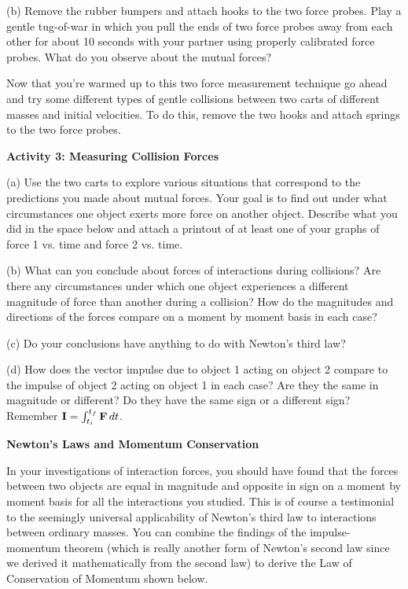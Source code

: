 (b) Remove the rubber bumpers and attach hooks to the two force probes. Play a gentle tug-of-war in which you pull the ends of two force probes
away from each other for about 10 seconds with your partner using properly calibrated force probes. What do you observe about the mutual forces?
\vspace{20mm}

Now that you're warmed up to this two force measurement technique go ahead and
try some different types of gentle collisions between two carts of different
masses and initial velocities. To do this, remove the two hooks and attach springs to the two force probes.

\newpage
\textbf{Activity 3: Measuring Collision Forces }

(a) Use the two carts to explore various situations that correspond to the predictions
you made about mutual forces. Your goal is to find out under what circumstances
one object exerts more force on another object. Describe what you did in the
space below and attach a printout of at least one of your graphs of force 1
vs. time and force 2 vs. time.
\vspace{30mm}

(b) What can you conclude about forces of interactions during collisions? Are there any circumstances under which one object experiences a different magnitude of force
than another during a collision? How do the magnitudes and directions of the
forces compare on a moment by moment basis in each case? 
\vspace{30mm}

(c) Do your conclusions have anything to do with Newton's third law?
\vspace{20mm}

(d) How does the vector impulse due to object 1 acting on object 2 compare to
the impulse of object 2 acting on object 1 in each case? Are they the same in
magnitude or different? Do they have the same sign or a different sign? Remember
\( {\bf I}=\int _{t_{i}}^{t_{f}}{\bf F}\,dt \).
\vspace{20mm}

\textbf{Newton's Laws and Momentum Conservation} 

In your investigations of interaction forces, you should have found that the
forces between two objects are equal in magnitude and opposite in sign on a
moment by moment basis for all the interactions you studied. This is of course
a testimonial to the seemingly universal applicability of Newton's third law
to interactions between ordinary masses. You can combine the findings of the
impulse-momentum theorem (which is really another form of Newton's second law
since we derived it mathematically from the second law) to derive the Law of
Conservation of Momentum shown below.

